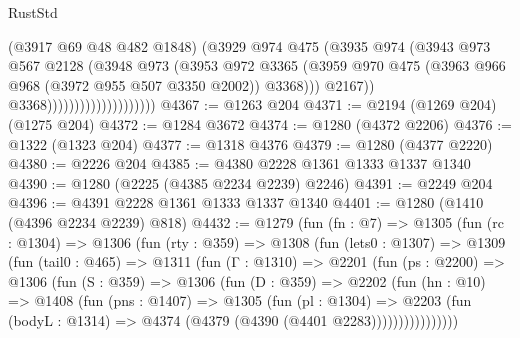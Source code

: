 \begin{lexlean}{RustStd}
\begin{coremodule}
{\begin{coremodule}
{{{{{{{{{{{{                                          (@3917 @69 @48 @482 @1848)
                                          (@3929
                                            @974
                                            @475
                                            (@3935
                                              @974
                                              (@3943
                                                @973
                                                @567
                                                @2128
                                                (@3948
                                                  @973
                                                  (@3953
                                                    @972
                                                    @3365
                                                    (@3959
                                                      @970
                                                      @475
                                                      (@3963
                                                        @966
                                                        @968
                                                        (@3972 @955 @507 @3350 @2002))
                                                      @3368)))
                                                @2167))
                                            @3368))))))))))))))))))))
@4367 := @1263 @204
@4371 := @2194 (@1269 @204) (@1275 @204)
@4372 := @1284 @3672
@4374 := @1280 (@4372 @2206)
@4376 := @1322 (@1323 @204)
@4377 := @1318 @4376
@4379 := @1280 (@4377 @2220)
@4380 := @2226 @204
@4385 := @4380 @2228 @1361 @1333 @1337 @1340
@4390 := @1280 (@2225 (@4385 @2234 @2239) @2246)
@4391 := @2249 @204
@4396 := @4391 @2228 @1361 @1333 @1337 @1340
@4401 := @1280 (@1410 (@4396 @2234 @2239) @818)
@4432 := @1279
    (fun (fn : @7) =>
    @1305
      (fun (rc : @1304) =>
      @1306
        (fun (rty : @359) =>
        @1308
          (fun (lets0 : @1307) =>
          @1309
            (fun (tail0 : @465) =>
            @1311
              (fun (Γ : @1310) =>
              @2201
                (fun (ps : @2200) =>
                @1306
                  (fun (S : @359) =>
                  @1306
                    (fun (D : @359) =>
                    @2202
                      (fun (hn : @10) =>
                      @1408
                        (fun (pns : @1407) =>
                        @1305
                          (fun (pl : @1304) =>
                          @2203
                            (fun (bodyL : @1314) => @4374 (@4379 (@4390 (@4401 @2283))))))))))))))))
}}}}}}}}}}}}
\end{coremodule}}
\end{coremodule}
\end{lexlean}
